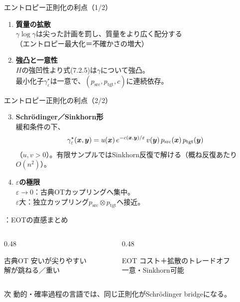 \asmain
\begin{frame}{エントロピー正則化の利点（1/2）}
    \begin{enumerate}
        \item \textbf{質量の拡散}\\
        $\gamma\log\gamma$は尖った計画を罰し、質量をより広く配分する\\
        （エントロピー最大化＝不確かさの増大）
        \item \textbf{強凸と一意性}\\
        $H$の強凹性より式(7.2.5)は$\gamma$について強凸。\\
        最小化子$\gamma_{\varepsilon}^{\star}$は一意で、$(p_{\mathrm{src}},p_{\mathrm{tgt}},c)$に連続依存。
    \end{enumerate}
\end{frame}
\asmain
\begin{frame}{エントロピー正則化の利点（2/2）}
    \begin{enumerate}
        \setcounter{enumi}{2}
        \item \textbf{Schrödinger／Sinkhorn形}\\
        緩和条件の下、
        \[
            \gamma_{\varepsilon}^{\star}(\bm{x},\bm{y})
            =
            u(\bm{x})\,e^{-c(\bm{x},\bm{y})/\varepsilon}\,v(\bm{y})\,
            p_{\mathrm{src}}(\bm{x})\,p_{\mathrm{tgt}}(\bm{y})
        \]
        （$u,v>0$）。有限サンプルではSinkhorn反復で解ける（概ね反復あたり$O(n^{2})$）。
        \item \textbf{$\varepsilon$の極限}\\
        $\varepsilon\to 0$：古典OTカップリングへ集中。\\
        $\varepsilon$大：独立カップリング$p_{\mathrm{src}}\otimes p_{\mathrm{tgt}}$へ接近。
    \end{enumerate}
\end{frame}
\assuppl
\begin{frame}{\supplmark：EOTの直感まとめ}
    \begin{columns}[T,onlytextwidth]
        \begin{column}{0.48\textwidth}
            \begin{block}{古典OT}
                安いが尖りやすい\\
                解が跳ねる／重い
            \end{block}
        \end{column}
        \begin{column}{0.48\textwidth}
            \begin{block}{EOT}
                コスト＋拡散のトレードオフ\\
                一意・Sinkhorn可能
            \end{block}
        \end{column}
    \end{columns}
    \vspace{0.5em}
    \begin{exampleblock}{次}
        動的・確率過程の言語では、同じ正則化がSchrödinger bridgeになる。
    \end{exampleblock}
\end{frame}
